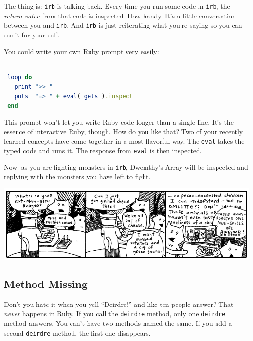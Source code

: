 \documentclass[10pt,twoside]{report}
\begin{document}
The thing is: \lstinline[breaklines=true]|irb| is talking back.  Every
time you run some code in \lstinline[breaklines=true]|irb|, the {\em
  return value} from that code is inspected.  How handy.  It's a
little conversation between you and \lstinline[breaklines=true]|irb|.
And \lstinline[breaklines=true]|irb| is just reiterating what you're
saying so you can see it for your self.

You could write your own Ruby prompt very easily:


\begin{lstlisting}[basicstyle=\ttfamily\color{basiccolor},
    commentstyle = \ttfamily\color{commentcolor},
    keywordstyle=\ttfamily\color{keywordscolor},
    stringstyle=\color{stringcolor},
    language=Ruby,
    basicstyle=\small\ttfamily,
    showstringspaces=false,
  ]

 loop do
   print ">> "
   puts  "=> " + eval( gets ).inspect
 end

\end{lstlisting}


This prompt won't let you write Ruby code longer than a single line.
It's the essence of interactive Ruby, though.  How do you like that?
Two of your recently learned concepts have come together in a most
flavorful way.  The \lstinline[breaklines=true]|eval| takes the typed
code and runs it. The response from \lstinline[breaklines=true]|eval|
is then inspected.

Now, as you are fighting monsters in \lstinline[breaklines=true]|irb|,
Dwemthy's Array will be inspected and replying with the monsters you
have left to fight.

	\includegraphics[width=1.0\textwidth]{cache/65.png}



\subsection{Method Missing}



Don't you hate it when you yell ``Deirdre!'' and like ten people
answer?  That {\em never} happens in Ruby.  If you call the
\lstinline[breaklines=true]|deirdre| method, only one
\lstinline[breaklines=true]|deirdre| method answers.  You can't have
two methods named the same.  If you add a second
\lstinline[breaklines=true]|deirdre| method, the first one disappears.
\end{document}
